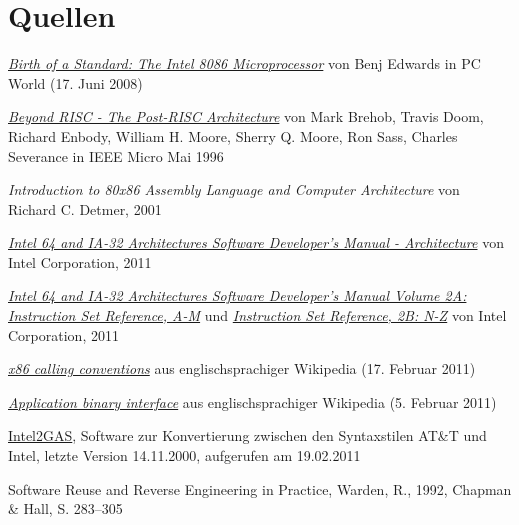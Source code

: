 \section{Quellen}

\begin{thebibliography}{9}

  \href{http://www.pcworld.com/article/146957/birth_of_a_standard_the_intel_8086_microprocessor.html}{
  \emph{Birth of a Standard: The Intel 8086 Microprocessor}}
	von Benj Edwards
	in PC World (17. Juni 2008)
	

	\href{http://www.cse.msu.edu/~enbody/postrisc/postrisc2.htm}{\emph{Beyond RISC - The Post-RISC Architecture}}
	von Mark Brehob, Travis Doom, Richard Enbody, William H. Moore, Sherry Q. Moore, Ron Sass, Charles Severance
	in IEEE Micro Mai 1996

	\emph{Introduction to 80x86 Assembly Language and Computer Architecture}
	von Richard C. Detmer,
	2001

	\href{http://www.intel.com/Assets/PDF/manual/253665.pdf}{
	\emph{Intel 64 and IA-32 Architectures Software Developer's Manual - Architecture}}
	von Intel Corporation,
	2011

	\href{http://www.intel.com/Assets/PDF/manual/253666.pdf}{
	\emph{Intel 64 and IA-32 Architectures Software Developer's Manual Volume 2A: Instruction Set Reference, A-M}} und
	\href{http://www.intel.com/Assets/PDF/manual/253667.pdf}{
	\emph{Instruction Set Reference, 2B: N-Z}}	von Intel Corporation,
	2011

	\href{https://secure.wikimedia.org/wikipedia/en/w/index.php?title=X86_calling_conventions&oldid=414385219}{\emph{x86 calling conventions}} aus englischsprachiger Wikipedia (17. Februar 2011)

	\href{https://secure.wikimedia.org/wikipedia/en/w/index.php?title=Application_binary_interface&oldid=412119478}{\emph{Application binary interface}} aus englischsprachiger Wikipedia (5. Februar 2011)

	\href{http://www.niksula.hut.fi/~mtiihone/intel2gas/}{Intel2GAS}, Software zur Konvertierung zwischen den Syntaxstilen AT\&T und Intel, letzte Version 14.11.2000, aufgerufen am 19.02.2011

 Software Reuse and Reverse Engineering in Practice, Warden, R., 1992, Chapman \& Hall, S. 283–305


\end{thebibliography}

